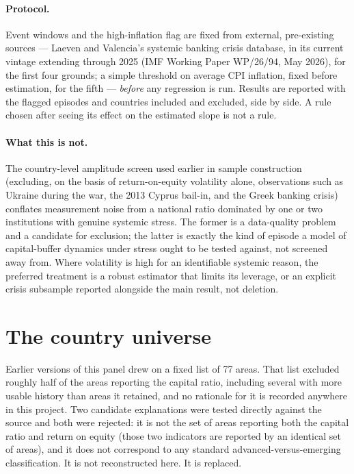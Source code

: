\documentclass[11pt]{article}
\begin{document}
\paragraph{Protocol.} Event windows and the high-inflation flag are fixed
from external, pre-existing sources --- Laeven and Valencia's systemic
banking crisis database, in its current vintage extending through 2025
(IMF Working Paper WP/26/94, May 2026), for the first four grounds; a
simple threshold on average CPI inflation, fixed before estimation, for
the fifth --- \emph{before} any regression is run. Results are reported
with the flagged episodes and countries included and excluded, side by
side. A rule chosen after seeing its effect on the estimated slope is not
a rule.

\paragraph{What this is not.} The country-level amplitude screen used
earlier in sample construction (excluding, on the basis of return-on-equity
volatility alone, observations such as Ukraine during the war, the 2013
Cyprus bail-in, and the Greek banking crisis) conflates measurement noise
from a national ratio dominated by one or two institutions with genuine
systemic stress. The former is a data-quality problem and a candidate for
exclusion; the latter is exactly the kind of episode a model of
capital-buffer dynamics under stress ought to be tested against, not
screened away from. Where volatility is high for an identifiable systemic
reason, the preferred treatment is a robust estimator that limits its
leverage, or an explicit crisis subsample reported alongside the main
result, not deletion.

\section{The country universe}
\label{sec:universe}

Earlier versions of this panel drew on a fixed list of 77 areas. That list
excluded roughly half of the areas reporting the capital ratio, including
several with more usable history than areas it retained, and no rationale
for it is recorded anywhere in this project. Two candidate explanations
were tested directly against the source and both were rejected: it is not
the set of areas reporting both the capital ratio and return on equity
(those two indicators are reported by an identical set of areas), and it
does not correspond to any standard advanced-versus-emerging
classification. It is not reconstructed here. It is replaced.
\end{document}
